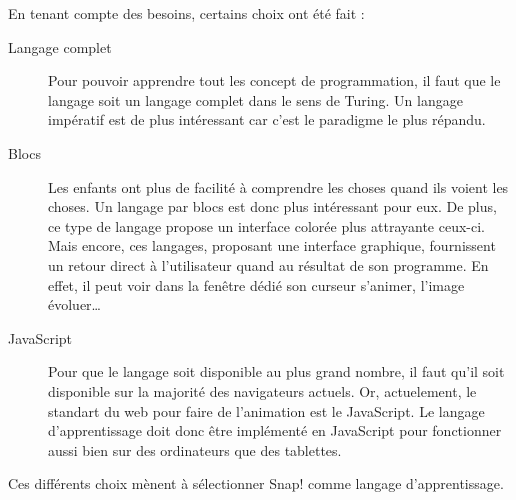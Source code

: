 En tenant compte des besoins, certains choix ont été fait :
\begin{description}
  \item[Langage complet] Pour pouvoir apprendre tout les concept de programmation, il faut que le langage soit un langage complet dans le sens de Turing. Un langage impératif est de plus intéressant car c'est le paradigme le plus répandu.
  \item[Blocs] Les enfants ont plus de facilité à comprendre les choses quand ils voient les choses. Un langage par blocs est donc plus intéressant pour eux. De plus, ce type de langage propose un interface colorée plus attrayante ceux-ci. Mais encore, ces langages, proposant une interface graphique, fournissent un retour direct à l'utilisateur quand au résultat de son programme. En effet, il peut voir dans la fenêtre dédié son curseur s'animer, l'image évoluer\ldots %
  \item[JavaScript] Pour que le langage soit disponible au plus grand nombre, il faut qu'il soit disponible sur la majorité des navigateurs actuels. Or, actuelement, le standart du web pour faire de l'animation est le JavaScript. Le langage d'apprentissage doit donc être implémenté en JavaScript pour fonctionner aussi bien sur des ordinateurs que des tablettes.
\end{description}
Ces différents choix mènent à sélectionner Snap! comme langage d'apprentissage.

